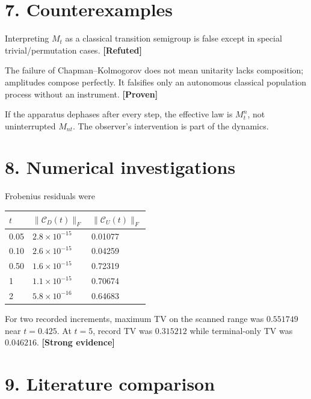 \documentclass[11pt,a4paper,openany]{report}
\newcommand{\statusProven}{\textcolor{fingreen}{[Proven]}}
\newcommand{\statusStrong}{\textcolor{finblue}{[Strong evidence]}}
\newcommand{\statusRefuted}{\textcolor{finred}{[Refuted]}}
\begin{document}
\section{7. Counterexamples}

Interpreting \(M_t\) as a classical transition semigroup is false except in special trivial/\allowbreak{}permutation cases. \textbf{\statusRefuted{}}

The failure of Chapman–Kolmogorov does not mean unitarity lacks composition; amplitudes compose perfectly. It falsifies only an autonomous classical population process without an instrument. \textbf{\statusProven{}}

If the apparatus dephases after every step, the effective law is \(M_t^n\), not uninterrupted \(M_{nt}\). The observer's intervention is part of the dynamics.

\section{8. Numerical investigations}

Frobenius residuals were

\begin{center}
\begingroup\small
\setlength{\tabcolsep}{3.5pt}
\renewcommand{\arraystretch}{1.16}
\begin{longtable}{@{}p{}p{}p{}@{}}
\toprule
\textbf{\(t\)} & \textbf{\(\|\mathcal C_D(t)\|_F\)} & \textbf{\(\|\mathcal C_U(t)\|_F\)} \\
\midrule
\endhead
0.05 & \(2.8\times10^{-15}\) & 0.01077 \\
0.10 & \(2.6\times10^{-15}\) & 0.04259 \\
0.50 & \(1.6\times10^{-15}\) & 0.72319 \\
1 & \(1.1\times10^{-15}\) & 0.70674 \\
2 & \(5.8\times10^{-16}\) & 0.64683 \\
\bottomrule
\end{longtable}
\endgroup
\end{center}

For two recorded increments, maximum TV on the scanned range was \(0.551749\) near \(t=0.425\). At \(t=5\), record TV was \(0.315212\) while terminal-only TV was \(0.046216\). \textbf{\statusStrong{}}

\section{9. Literature comparison}
\end{document}
